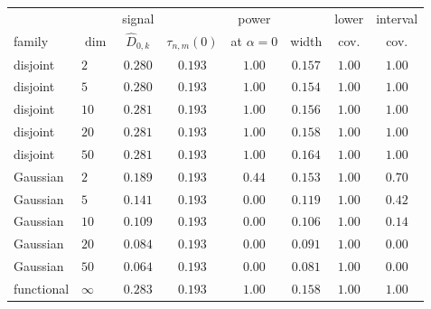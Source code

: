 \begin{tabular}{llcccccc}
\toprule
& & signal & & power & & lower & interval \\
family & $\dim$ & $\widehat D_{0,k}$ & $\tau_{n,m}(0)$ & at $\alpha=0$ & width & cov. & cov. \\
\midrule
disjoint & $2$ & $0.280$ & $0.193$ & $1.00$ & $0.157$ & $1.00$ & $1.00$ \\
disjoint & $5$ & $0.280$ & $0.193$ & $1.00$ & $0.154$ & $1.00$ & $1.00$ \\
disjoint & $10$ & $0.281$ & $0.193$ & $1.00$ & $0.156$ & $1.00$ & $1.00$ \\
disjoint & $20$ & $0.281$ & $0.193$ & $1.00$ & $0.158$ & $1.00$ & $1.00$ \\
disjoint & $50$ & $0.281$ & $0.193$ & $1.00$ & $0.164$ & $1.00$ & $1.00$ \\
\midrule
Gaussian & $2$ & $0.189$ & $0.193$ & $0.44$ & $0.153$ & $1.00$ & $0.70$ \\
Gaussian & $5$ & $0.141$ & $0.193$ & $0.00$ & $0.119$ & $1.00$ & $0.42$ \\
Gaussian & $10$ & $0.109$ & $0.193$ & $0.00$ & $0.106$ & $1.00$ & $0.14$ \\
Gaussian & $20$ & $0.084$ & $0.193$ & $0.00$ & $0.091$ & $1.00$ & $0.00$ \\
Gaussian & $50$ & $0.064$ & $0.193$ & $0.00$ & $0.081$ & $1.00$ & $0.00$ \\
\midrule
functional & $\infty$ & $0.283$ & $0.193$ & $1.00$ & $0.158$ & $1.00$ & $1.00$ \\
\bottomrule
\end{tabular}
